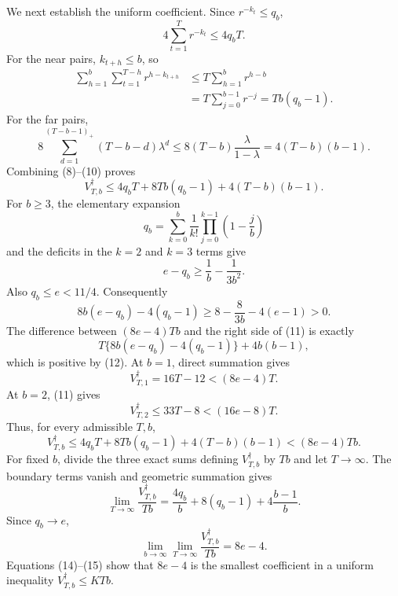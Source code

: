 We next establish the uniform coefficient. Since \(r^{-k_t}\le q_b\),
\[
4\sum_{t=1}^T r^{-k_t}\le4q_bT.
\tag{8}
\]
For the near pairs, \(k_{t+h}\le b\), so
\[
\begin{aligned}
\sum_{h=1}^b\sum_{t=1}^{T-h}r^{h-k_{t+h}}
&\le T\sum_{h=1}^br^{h-b}\\
&=T\sum_{j=0}^{b-1}r^{-j}
=Tb(q_b-1).
\end{aligned}
\tag{9}
\]
For the far pairs,
\[
8\sum_{d=1}^{(T-b-1)_+}(T-b-d)\lambda^d
\le8(T-b)\frac{\lambda}{1-\lambda}
=4(T-b)(b-1).
\tag{10}
\]
Combining (8)--(10) proves
\[
V_{T,b}^{\dagger}
\le4q_bT+8Tb(q_b-1)+4(T-b)(b-1).
\tag{11}
\]
For \(b\ge3\), the elementary expansion
\[
q_b=\sum_{k=0}^b\frac1{k!}\prod_{j=0}^{k-1}\left(1-\frac jb\right)
\]
and the deficits in the \(k=2\) and \(k=3\) terms give
\[
e-q_b\ge\frac1b-\frac1{3b^2}.
\]
Also \(q_b\le e<11/4\). Consequently
\[
8b(e-q_b)-4(q_b-1)
\ge8-\frac8{3b}-4(e-1)>0.
\tag{12}
\]
The difference between \((8e-4)Tb\) and the right side of (11) is exactly
\[
T\{8b(e-q_b)-4(q_b-1)\}+4b(b-1),
\tag{13}
\]
which is positive by (12). At \(b=1\), direct summation gives
\[
V_{T,1}^{\dagger}=16T-12<(8e-4)T.
\]
At \(b=2\), (11) gives
\[
V_{T,2}^{\dagger}\le33T-8<(16e-8)T.
\]
Thus, for every admissible \(T,b\),
\[
V_{T,b}^{\dagger}\le4q_bT+8Tb(q_b-1)+4(T-b)(b-1)<(8e-4)Tb.
\tag{14}
\]
For fixed \(b\), divide the three exact sums defining \(V_{T,b}^{\dagger}\) by \(Tb\) and let \(T\to\infty\). The boundary terms vanish and geometric summation gives
\[
\lim_{T\to\infty}\frac{V_{T,b}^{\dagger}}{Tb}
=\frac{4q_b}{b}+8(q_b-1)+4\frac{b-1}{b}.
\]
Since \(q_b\to e\),
\[
\lim_{b\to\infty}\lim_{T\to\infty}\frac{V_{T,b}^{\dagger}}{Tb}=8e-4.
\tag{15}
\]
Equations (14)--(15) show that \(8e-4\) is the smallest coefficient in a uniform inequality \(V_{T,b}^{\dagger}\le KTb\).

